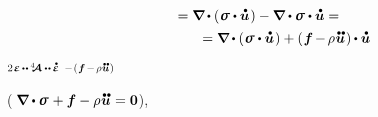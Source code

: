\begin{equation*}
\begin{array}{c}
= \boldnabla \hspace{-0.1ex} \dotp \left( \hspace{.1ex} \linearstress \dotp \mathdotabove{\bm{u}} \hspace{.15ex} \right) -
\tikzmark{NablaDotTauDynamicsBegin} \boldnabla \dotp \linearstress \tikzmark{NablaDotTauDynamicsEnd} \dotp \mathdotabove{\bm{u}} =
\\[.4em]
%
\hspace*{4em}
= \boldnabla \hspace{-0.1ex} \dotp \left( \hspace{.1ex} \linearstress \dotp \mathdotabove{\bm{u}} \hspace{.15ex} \right)
+ ( \hspace{.12ex} \bm{f} \hspace{-0.2ex} - \hspace{-0.2ex} \rho \hspace{.1ex} \mathdotdotabove{\bm{u}} \hspace{.15ex} ) \hspace{-0.1ex} \dotp \mathdotabove{\bm{u}}
\end{array}
\end{equation*}%
%
{${\scalebox{0.75}{$ 2 \hspace{.2ex} \infinitesimaldeformation \hspace{-0.1ex} \dotdotp \hspace{-0.1ex} \stiffnesstensor \dotdotp \hspace{-0.1ex} \mathdotabove{\infinitesimaldeformation} $}}$}
%
{${\scalebox{0.75}{$ - \hspace{.2ex} ( \hspace{.12ex} \bm{f} \hspace{-0.2ex} - \hspace{-0.2ex} \rho \hspace{.1ex} \mathdotdotabove{\bm{u}} \hspace{.15ex} ) $}}$}

\nopagebreak\vspace{-0.6em}\noindent
(
${\hspace{-0.24ex}\boldnabla \dotp \linearstress \hspace{.15ex} + \bm{f} - \rho \hspace{.1ex} \mathdotdotabove{\bm{u}} \hspace{.1ex} = \bm{0}}$),

